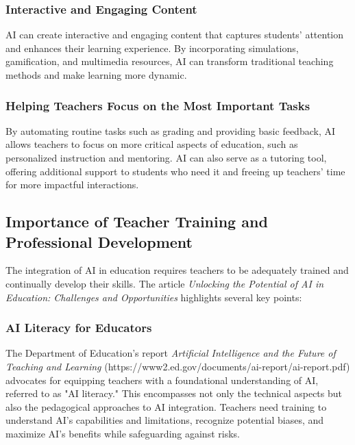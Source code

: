 \documentclass{article}
\begin{document}
\subsubsection{Interactive and Engaging Content}

AI can create interactive and engaging content that captures students' attention and enhances their learning experience. By incorporating simulations, gamification, and multimedia resources, AI can transform traditional teaching methods and make learning more dynamic.

\subsubsection{Helping Teachers Focus on the Most Important Tasks}

By automating routine tasks such as grading and providing basic feedback, AI allows teachers to focus on more critical aspects of education, such as personalized instruction and mentoring. AI can also serve as a tutoring tool, offering additional support to students who need it and freeing up teachers' time for more impactful interactions.

\subsection{Importance of Teacher Training and Professional Development}

The integration of AI in education requires teachers to be adequately trained and continually develop their skills. The article \cite{Rashmi2023Unlocking} \textit{Unlocking the Potential of AI in Education: Challenges and Opportunities} highlights several key points:

\subsubsection{AI Literacy for Educators}

The Department of Education's report \textit{Artificial Intelligence and the Future of Teaching and Learning} (https://www2.ed.gov/documents/ai-report/ai-report.pdf) advocates for equipping teachers with a foundational understanding of AI, referred to as "AI literacy." This encompasses not only the technical aspects but also the pedagogical approaches to AI integration. Teachers need training to understand AI's capabilities and limitations, recognize potential biases, and maximize AI's benefits while safeguarding against risks.
\end{document}
